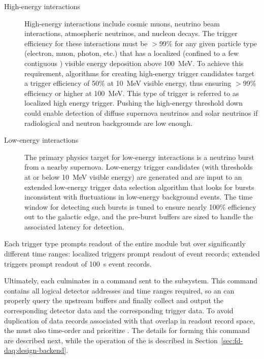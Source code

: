 \begin{description}
\item[High-energy interactions] High-energy interactions include cosmic muons, neutrino beam interactions, atmospheric neutrinos, and nucleon decays. 
  The trigger efficiency for these interactions must be $>$99\% for any given particle type (electron, muon, photon, etc.) that has a localized (confined to a few contiguous ) visible energy deposition above \SI{100}{\MeV}.
  To achieve this requirement, algorithms for creating high-energy trigger candidates  target a trigger efficiency of 50\% at \SI{10}{\MeV} visible energy, thus ensuring $>$99\% efficiency or higher at \SI{100}{\MeV}.
  This type of trigger is referred to as localized high energy trigger. 
  Pushing the high-energy threshold down could enable detection of diffuse supernova neutrinos and solar neutrinos if radiological and neutron backgrounds are low enough.

\item[Low-energy interactions] The primary physics target for
  low-energy interactions is a neutrino burst from a nearby supernova. 
  Low-energy trigger candidates (with thresholds at or below
  \SI{10}{\MeV} visible energy) are generated and are input to an
  extended low-energy trigger data selection algorithm that looks for bursts inconsistent with fluctuations in low-energy background events. 
  The time window for detecting such bursts is tuned to ensure
  nearly 100\% efficiency out to the galactic edge, and the pre-burst
  buffers are sized to handle the associated latency for detection.

\end{description}

\noindent Each trigger type prompts readout
of the entire module but over significantly different time
ranges: localized triggers prompt readout of \spreadout event records; extended
triggers prompt readout of \SI{100}{\second} event records. 

Ultimately, each  culminates in a command sent to
the  subsystem. 
This command contains all logical detector addresses and time ranges
required, so an  can properly query the upstream 
buffers and finally collect and output the corresponding detector data
and the corresponding trigger data. To avoid duplication of data
records associated with  that overlap in readout
record space, the  must also time-order and
prioritize . The details for forming this
command are described next, while the operation of the  is
described in Section~\ref{sec:fd-daq:design-backend}.

